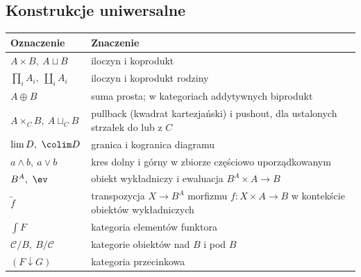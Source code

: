 \subsection{Konstrukcje uniwersalne}
\begin{center}
\renewcommand{\arraystretch}{1.15}
\begin{tabular}{@{}p{.34\linewidth}p{.60\linewidth}@{}}
\textbf{Oznaczenie} & \textbf{Znaczenie} \\
\hline
$A\times B,\ A\sqcup B$ & iloczyn i koprodukt \\
$\prod_i A_i,\ \coprod_i A_i$ & iloczyn i koprodukt rodziny \\
$A\oplus B$ & suma prosta; w kategoriach addytywnych biprodukt \\
$A\times_C B,\ A\sqcup_C B$ & pullback (kwadrat kartezjański) i pushout, dla ustalonych strzałek do lub z $C$ \\
$\lim D,\ \colim D$ & granica i kogranica diagramu \\
$a\wedge b,\ a\vee b$ & kres dolny i górny w zbiorze częściowo uporządkowanym \\
$B^A,\ \ev$ & obiekt wykładniczy i ewaluacja $B^A\times A\to B$ \\
$\widetilde f$ & transpozycja $X\to B^A$ morfizmu $f:X\times A\to B$ w kontekście obiektów wykładniczych \\
$\int F$ & kategoria elementów funktora \\
$\mathcal C/B,\ B/\mathcal C$ & kategorie obiektów nad $B$ i pod $B$ \\
$(F\downarrow G)$ & kategoria przecinkowa \\
\end{tabular}
\end{center}

